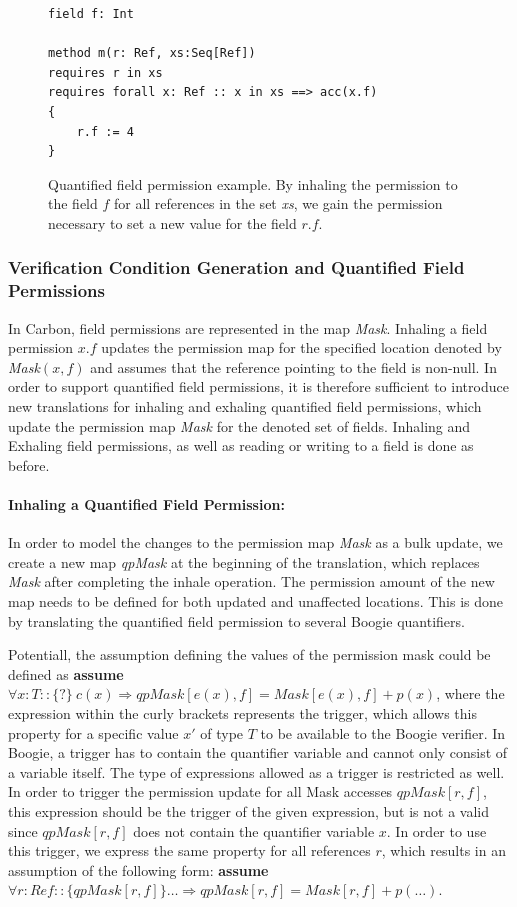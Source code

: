 \documentclass[12pt]{article}
\begin{document}
\begin{figure}[h]
  \centering
\begin{lstlisting}
field f: Int

method m(r: Ref, xs:Seq[Ref])
requires r in xs
requires forall x: Ref :: x in xs ==> acc(x.f)
{
    r.f := 4
}
\end{lstlisting}
\caption[quantified field permission example example]
   {Quantified field permission example. By inhaling the permission to the field \(f\) for all references in the set \textit{xs}, we gain the permission necessary to set a new value for the field \(r.f\).}
\label{qfExample}
\end{figure}

\subsubsection{Verification Condition Generation and Quantified Field Permissions}
\label{cgqf}
In Carbon, field permissions are represented in the map \textit{Mask}. Inhaling a field permission \(x.f\) updates the permission map for the specified location denoted by \textit{Mask}\((x, f)\) and assumes  that the reference pointing to the field is non-null. In order to support quantified field permissions, it is therefore sufficient to introduce new translations for inhaling and exhaling quantified field permissions, which update the permission map \textit{Mask} for the denoted set of fields.
Inhaling and Exhaling field permissions, as well as reading or writing to a field is done as before.

\paragraph{Inhaling a Quantified Field Permission: }
In order to model the changes to the permission map \textit{Mask} as a bulk update, we create a new map \textit{qpMask} at the beginning of the translation, which replaces \textit{Mask} after completing the inhale operation. The permission amount of the new map needs to be defined for both updated and unaffected locations. This is done by translating the quantified field permission to several Boogie quantifiers. 

Potentiall, the assumption defining the values of the permission mask could be defined as \textbf{assume} \(\forall x:T :: \{?\}\ c(x) \Rightarrow qpMask[e(x), f] = Mask[e(x), f] + p(x)\), where the expression within the curly brackets represents the trigger, which allows this property for a specific value \(x'\) of type \(T\) to be available to the Boogie verifier. In Boogie, a trigger has to contain the quantifier variable and cannot only consist of a variable itself. The type of expressions allowed as a trigger is restricted as well. In order to trigger the permission update for all Mask accesses \(qpMask[r, f] \), this expression should be the trigger of the given expression, but is not a valid since  \(qpMask[r, f] \) does not contain the quantifier variable \(x\). 
In order to use this trigger, we express the same property for all references \(r\), which results in an assumption of the following form: \textbf{assume} \(\forall r:Ref :: \{qpMask[r, f]\} \dots \Rightarrow qpMask[r, f] = Mask[r, f] + p(\dots)\).
\end{document}
